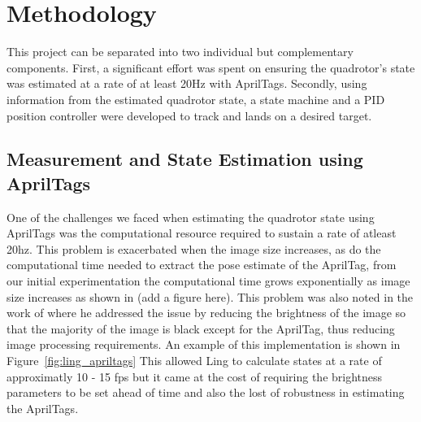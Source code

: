 \documentclass[11pt, twocolumn]{article}
\begin{document}
\section{Methodology}
This project can be separated into two individual but complementary components. First, a significant effort was spent on ensuring the quadrotor's state was estimated at a rate of at least 20Hz with AprilTags. Secondly, using information from the estimated quadrotor state, a state machine and a PID position controller were developed to track and lands on a desired target.

\subsection{Measurement and State Estimation using AprilTags}
\label{subsec:AprilTag}
One of the challenges we faced when estimating the quadrotor state using AprilTags was the computational resource required to sustain a rate of atleast 20hz. This problem is exacerbated when the image size increases, as do the computational time needed to extract the pose estimate of the AprilTag, from our initial experimentation the computational time grows exponentially as image size increases as shown in (add a figure here). This problem was also noted in the work of \cite{Ling2014} where he addressed the issue by reducing the brightness of the image so that the majority of the image is black except for the AprilTag, thus reducing image processing requirements. An example of this implementation is shown in Figure~\ref{fig:ling_apriltags} This allowed Ling \cite{Lee2012} to calculate states at a rate of approximatly 10 - 15 fps but it came at the cost of requiring the brightness parameters to be set ahead of time and also the lost of robustness in estimating the AprilTags.
\end{document}
